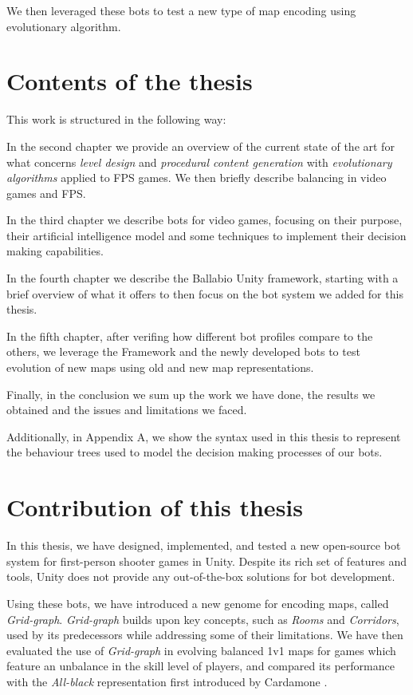 We then leveraged these bots to test a new type of map encoding using evolutionary algorithm.

\section{Contents of the thesis}
This work is structured in the following way:

In the second chapter we provide an overview of the current state of the art for what concerns \textit{level design} and \textit{procedural content generation} with \textit{evolutionary algorithms} applied to FPS games. We then briefly describe balancing in video games and FPS.

In the third chapter we describe bots for video games, focusing on their purpose, their artificial intelligence model and some techniques to implement their decision making capabilities.

In the fourth chapter we describe the Ballabio Unity framework, starting with a brief overview of what it offers to then focus on the bot system we added for this thesis.

In the fifth chapter, after verifing how different bot profiles compare to the others, we leverage the Framework and the newly developed bots to test evolution of new maps using old and new map representations.

Finally, in the conclusion we sum up the work we have done, the results we obtained and the issues and limitations we faced.

Additionally, in Appendix A, we show the syntax used in this thesis to represent the behaviour trees used to model the decision making processes of our bots.

\section{Contribution of this thesis}
In this thesis, we have designed, implemented, and tested a new open-source bot system for first-person shooter games in Unity. Despite its rich set of features and tools, Unity does not provide any out-of-the-box solutions for bot development.

Using these bots, we have introduced a new genome for encoding maps, called \textit{Grid-graph}. \textit{Grid-graph} builds upon key concepts, such as \textit{Rooms} and \textit{Corridors}, used by its predecessors while addressing some of their limitations. We have then evaluated the use of \textit{Grid-graph} in evolving balanced 1v1 maps for games which feature an unbalance in the skill level of players, and compared its performance with the \textit{All-black} representation first introduced by Cardamone \cite{cardamone_evolving_maps}.